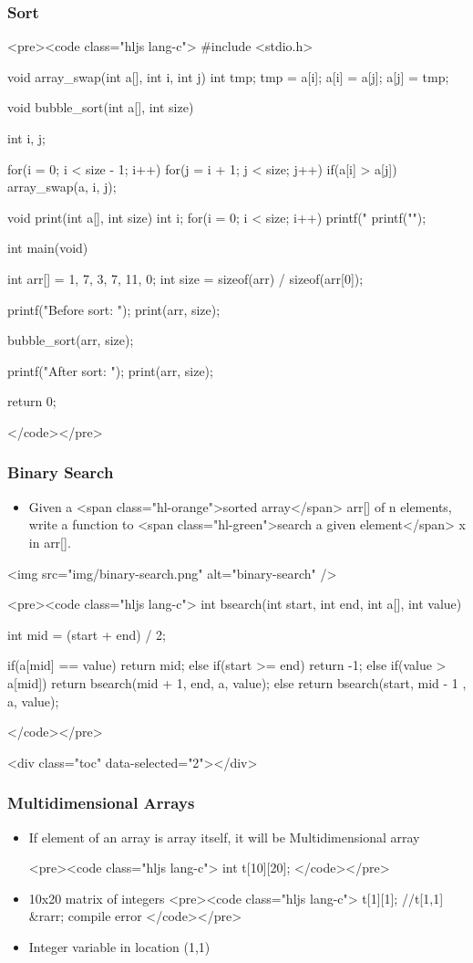 \documentclass{../c-lecture}
\begin{document}
\begin{frame}
  \frametitle{Sort}
  <pre><code class="hljs lang-c">
#include <stdio.h>

void array_swap(int a[], int i, int j){
  int tmp;
  tmp = a[i];
  a[i] = a[j];
  a[j] = tmp;
}

void bubble_sort(int a[], int size){
  int i, j;

  for(i = 0; i < size - 1; i++)
    for(j = i + 1; j < size; j++)
      if(a[i] > a[j])
        array_swap(a, i, j);
}

void print(int a[], int size){
  int i;
  for(i = 0; i < size; i++)
    printf("%
  printf("\n");
}

int main(void){
  int arr[] = {1, 7, 3, 7, 11, 0};
  int size = sizeof(arr) / sizeof(arr[0]);

  printf("Before sort: ");
  print(arr, size);

  bubble_sort(arr, size);

  printf("After sort: ");
  print(arr, size);

  return 0;
}
  </code></pre>
\end{frame}
\begin{frame}
  \begin{frame}
    \frametitle{Binary Search}
    \begin{itemize}
      \item
        Given a <span class="hl-orange">sorted array</span> arr[] of n elements,
        write a function to
        <span class="hl-green">search a given element</span> x in arr[].

    \end{itemize}
    <img src="img/binary-search.png" alt="binary-search" />
  \end{frame}
  \begin{frame}
    <pre><code class="hljs lang-c">
int bsearch(int start, int end, int a[], int value){
  int mid = (start + end) / 2;

  if(a[mid] == value)
     return mid;
  else if(start >= end)
    return -1;
  else if(value > a[mid])
    return bsearch(mid + 1, end, a, value);
  else
    return bsearch(start, mid - 1 , a, value); }
    </code></pre>
  \end{frame}
\end{frame}
\begin{frame}
  <div class="toc" data-selected="2"></div>
\end{frame}
\begin{frame}
  \frametitle{Multidimensional Arrays}
  \begin{itemize}
    \item
      If element of an array is array itself, it will be Multidimensional array

    <pre><code class="hljs lang-c">
int t[10][20];
    </code></pre>
    \item 10x20 matrix of integers
    <pre><code class="hljs lang-c">
t[1][1]; //t[1,1] &rarr; compile error
    </code></pre>
    \item Integer variable in location (1,1)
  \end{itemize}
\end{frame}
\end{document}
